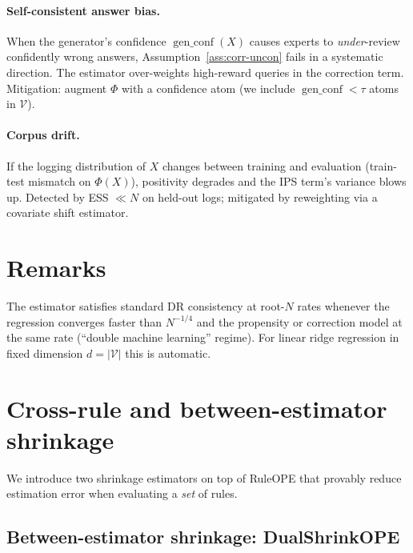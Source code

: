 \documentclass[11pt]{article}
\begin{document}
\paragraph{Self-consistent answer bias.}
When the generator's confidence $\operatorname{gen\_conf}(X)$ causes
experts to \emph{under}-review confidently wrong answers,
Assumption~\ref{ass:corr-uncon} fails in a systematic direction.  The
estimator over-weights high-reward queries in the correction term.
Mitigation: augment $\Phi$ with a confidence atom (we include
$\operatorname{gen\_conf}<\tau$ atoms in $\mathcal{V}$).

\paragraph{Corpus drift.}
If the logging distribution of $X$ changes between training and
evaluation (train-test mismatch on $\Phi(X)$), positivity degrades and
the IPS term's variance blows up.  Detected by ESS $\ll N$ on
held-out logs; mitigated by reweighting via a covariate shift
estimator.

\section{Remarks}

The estimator satisfies standard DR consistency at root-$N$ rates
whenever the regression converges faster than $N^{-1/4}$ and the
propensity or correction model at the same rate (``double machine
learning'' regime).  For linear ridge regression in fixed dimension
$d = |\mathcal{V}|$ this is automatic.

\section{Cross-rule and between-estimator shrinkage}

We introduce two shrinkage estimators on top of RuleOPE that provably
reduce estimation error when evaluating a \emph{set} of rules.

\subsection{Between-estimator shrinkage: DualShrinkOPE}
\end{document}
